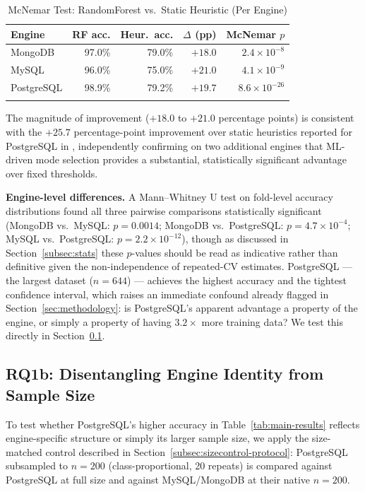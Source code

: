 \documentclass[pdflatex,sn-mathphys-num]{sn-jnl}
\theoremstyle{thmstyleone}
\theoremstyle{thmstylethree}
\begin{document}
\begin{table}[h]
\caption{McNemar Test: RandomForest vs.\ Static Heuristic (Per Engine)}\label{tab:mcnemar}
\begin{tabular}{@{}lrrrr@{}}
\toprule
Engine & RF acc. & Heur.\ acc. & $\Delta$ (pp) & McNemar $p$ \\
\midrule
MongoDB     & 97.0\% & 79.0\% & $+18.0$ & $2.4\times10^{-8}$ \\
MySQL       & 96.0\% & 75.0\% & $+21.0$ & $4.1\times10^{-9}$ \\
PostgreSQL  & 98.9\% & 79.2\% & $+19.7$ & $8.6\times10^{-26}$ \\
\botrule
\end{tabular}
\end{table}

The magnitude of improvement ($+18.0$ to $+21.0$ percentage points) is
consistent with the $+25.7$ percentage-point improvement over static
heuristics reported for PostgreSQL in \cite{iaha2026}, independently
confirming on two additional engines that ML-driven mode selection
provides a substantial, statistically significant advantage over fixed
thresholds.

\textbf{Engine-level differences.} A Mann--Whitney U test on
fold-level accuracy distributions found all three pairwise comparisons
statistically significant (MongoDB vs.\ MySQL: $p=0.0014$; MongoDB
vs.\ PostgreSQL: $p=4.7\times10^{-4}$; MySQL vs.\ PostgreSQL:
$p=2.2\times10^{-12}$), though as discussed in
Section~\ref{subsec:stats} these $p$-values should be read as
indicative rather than definitive given the non-independence of
repeated-CV estimates. PostgreSQL --- the largest dataset
($n=644$) --- achieves the highest accuracy and the tightest
confidence interval, which raises an immediate confound already
flagged in Section~\ref{sec:methodology}: is PostgreSQL's apparent
advantage a property of the engine, or simply a property of having
$3.2\times$ more training data? We test this directly in
Section~\ref{subsec:rq1b}.

\subsection{RQ1b: Disentangling Engine Identity from Sample Size}\label{subsec:rq1b}

To test whether PostgreSQL's higher accuracy in
Table~\ref{tab:main-results} reflects engine-specific structure or
simply its larger sample size, we apply the size-matched control
described in Section~\ref{subsec:sizecontrol-protocol}: PostgreSQL
subsampled to $n=200$ (class-proportional, 20 repeats) is compared
against PostgreSQL at full size and against MySQL/MongoDB at their
native $n=200$.
\end{document}
